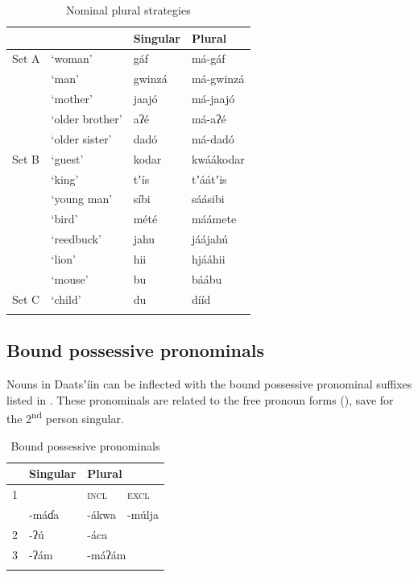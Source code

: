 \documentclass[output=paper]{langsci/langscibook}
\begin{document}
\begin{table}

\begin{tabularx}{\textwidth}{XXXX}
\lsptoprule
\multicolumn{1}{X}{} &  & Singular & \multicolumn{1}{X}{Plural}\\
\midrule
 Set A & ‘woman’ &  g\'{a}f &  m\'{a}-g\'{a}f \\
& ‘man’ &  gwinz\'{a} &  m\'{a}-gwinz\'{a}  \\
& ‘mother' &  jaaj\'{o} &  m\'{a}-jaaj\'{o}\\
& ‘older brother' & aʔ\'{e} &  m\'{a}-aʔ\'{e}\\
& ‘older sister' & dad\'{o} &  m\'{a}-dad\'{o}\\
Set B & ‘guest’ &  kodar &  kw\'{a}\'{a}kodar\\
& ‘king’ &  tʼ\'{i}s &  tʼ\'{a}\'{a}tʼis\\
& ‘young man' &  s\'{i}bi &  s\'{a}\'{a}sibi\\
& ‘bird' &  m\'{e}t\'{e} &  m\'{a}\'{a}mete\\
& ‘reedbuck' &  jahu &  j\'{a}\'{a}jah\'{u}\\
& ‘lion' &  hii &  hj\'{a}\'{a}hii \\
& ‘mouse’ &  bu & b\'{a}\'{a}bu\\
Set C & ‘child' &  du &  d\'{i}\'{i}d\\
\lspbottomrule
\end{tabularx}
\caption{Nominal plural strategies}
\label{tab:ahlandc:6}
\end{table}


\subsection{Bound possessive pronominals}\label{sec:ahlandc:7.2}


Nouns in Daatsʼ\'{i}in can be inflected with the bound possessive pronominal suffixes listed in . These pronominals are related to the free pronoun forms (), save for the 2\textsuperscript{nd} person singular. 


\begin{table}

\begin{tabularx}{\textwidth}{XXXX}
\lsptoprule 
&  Singular & \multicolumn{2}{X}{Plural}\\
\midrule
 1 &   & \scshape incl & \scshape excl\\
& {}-m\'{a}ɗa &  {}-\'{a}kwa & {}-m\'{u}lja\\
 2 &  {}-ʔ\'{u} & \multicolumn{2}{X}{{}-\'{a}ca}\\
 3 &  {}-ʔ\'{a}m & \multicolumn{2}{X}{{}-m\'{a}ʔ\'{a}m}\\
\lspbottomrule
\end{tabularx}
\caption{Bound possessive pronominals}
\label{tab:ahlandc:7}
\end{table}
\end{document}
